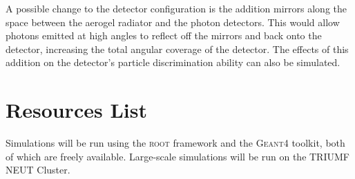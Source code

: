 A possible change to the detector configuration is the addition mirrors along the space between the aerogel radiator and the photon detectors. This would allow photons emitted at high angles to reflect off the mirrors and back onto the detector, increasing the total angular coverage of the detector. The effects of this addition on the detector's particle discrimination ability can also be simulated.




\section{Resources List}
Simulations will be run using the \textsc{root} framework and the \textsc{Geant4} toolkit, both of which are freely available. Large-scale simulations will be run on the TRIUMF NEUT Cluster.



\endinput

Any text after an \endinput is ignored.
You could put scraps here or things in progress.
